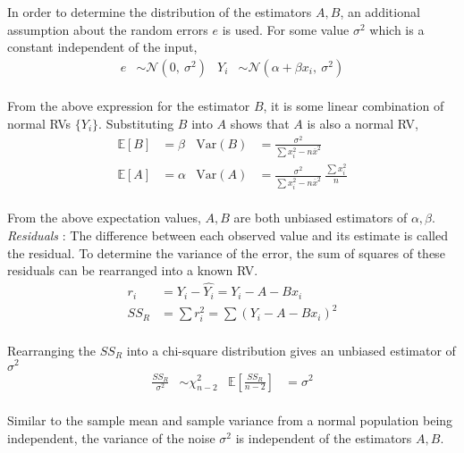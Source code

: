 In order to determine the distribution of the estimators $ A, B $, an additional assumption about the random errors $ e $ is used. For some value $ \sigma^2 $ which is a constant independent of the input, \\

\begin{align}
	e &\sim \mathcal{N}(0,\ \sigma^2) & Y_i &\sim \mathcal{N}(\alpha + \beta x_i,\ \sigma^2)
\end{align}\\

From the above expression for the estimator $ B $, it is some linear combination of normal RVs $ \{Y_i\} $. Substituting $ B $ into $ A $ shows that $ A $ is also a normal RV,\\

\begin{align}
	\mathbb{E}[B] &= \beta & \mathrm{Var}(B) &= \frac{\sigma^2}{\sum x_i^2  - n\overline{x}^2} \\
	\mathbb{E}[A] &= \alpha & \mathrm{Var}(A) &= \frac{\sigma^2}{\sum x_i^2  - n\overline{x}^2}\ \frac{\sum x_i^2}{n}
\end{align}\\

From the above expectation values, $ A, B $ are both unbiased estimators of $ \alpha, \beta $.\\

\textit{Residuals} : The difference between each observed value and its estimate is called the residual. To determine the variance of the error, the sum of squares of these residuals can be rearranged into a known RV.\\

\begin{align}
	r_i &= Y_i - \widehat{Y_i} = Y_i - A - B x_i \\
	SS_R &= \sum r_i^2 = \sum (Y_i - A - B x_i)^2
\end{align}\\

Rearranging the $ SS_R $ into a chi-square distribution gives an unbiased estimator of $ \sigma^2 $\\

\begin{align}
	\frac{SS_R}{\sigma^2} &\sim \chi^2_{n-2} & \mathbb{E}\left[ \frac{SS_R}{n-2} \right] &= \sigma^2
\end{align}\\

Similar to the sample mean and sample variance from a normal population being independent, the variance of the noise $ \sigma^2 $ is independent of the estimators $ A, B $.\\


